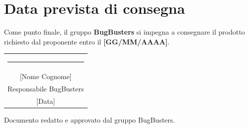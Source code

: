 \documentclass[a4paper,12pt]{article}
\begin{document}
\section{Data prevista di consegna}

Come punto finale, il gruppo \textbf{BugBusters} si impegna a consegnare il prodotto richiesto dal proponente entro il \textbf{[GG/MM/AAAA]}.

\vspace{2cm}

\begin{flushright}
\begin{tabular}{c}
\rule{6cm}{0.4pt} \\
{[Nome Cognome]} \\
Responsabile BugBusters \\[0.3cm]
{[Data]} \\
\end{tabular}
\end{flushright}

\vfill
\begin{center}
    {\small\color{darkgray} Documento redatto e approvato dal gruppo BugBusters.}
\end{center}
\end{document}
